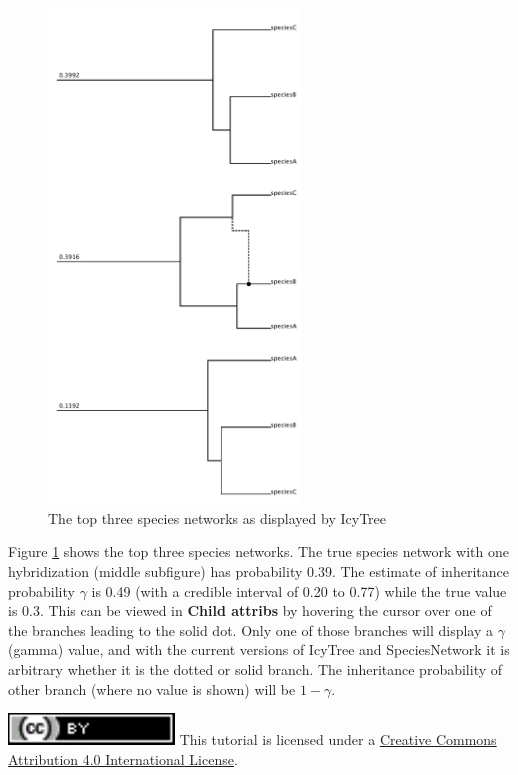 \documentclass[11pt]{article}
\begin{document}
\begin{figure}[h]
\center
\includegraphics[width=0.6\textwidth]{figs/icytree.pdf}
\caption{The top three species networks as displayed by IcyTree}
\label{fig_networks}
\end{figure}

Figure \ref{fig_networks} shows the top three species networks. The true species network with one hybridization (middle subfigure) has probability 0.39. The estimate of inheritance probability $\gamma$ is 0.49 (with a credible interval of 0.20 to 0.77) while the true value is 0.3. This can be viewed in \textbf{Child attribs} by hovering the cursor over one of the branches leading to the solid dot. Only one of those branches will display a $\gamma$ (gamma) value, and with the current versions of IcyTree and SpeciesNetwork it is arbitrary whether it is the dotted or solid branch. The inheritance probability of other branch (where no value is shown) will be $1 - \gamma$.

\clearpage
\noindent \href{http://creativecommons.org/licenses/by/4.0/}{\includegraphics[scale=0.7]{figs/fig_ccby.pdf}} This tutorial is licensed under a \href{http://creativecommons.org/licenses/by/4.0/}{Creative Commons Attribution 4.0 International License}. 



\end{document}
